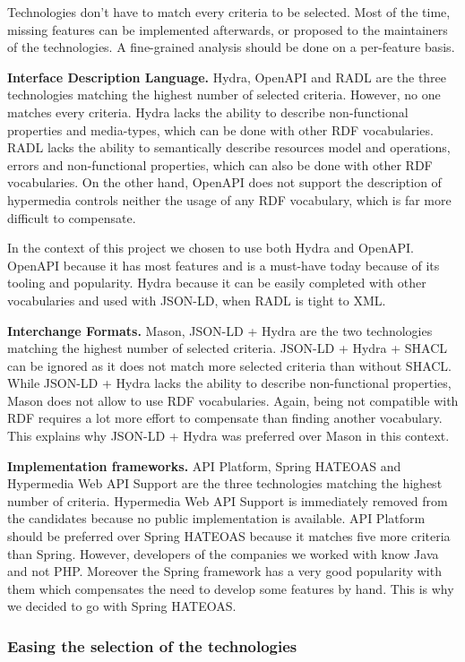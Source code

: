 Technologies don't have to match every criteria to be selected. Most of the time, missing features can be implemented afterwards, or proposed to the maintainers of the technologies. A fine-grained analysis should be done on a per-feature basis.

\textbf{Interface Description Language.} Hydra, OpenAPI and RADL are the three technologies matching the highest number of selected criteria. However, no one matches every criteria. Hydra lacks the ability to describe non-functional properties and media-types, which can be done with other RDF vocabularies. RADL lacks the ability to semantically describe resources model and operations, errors and non-functional properties, which can also be done with other RDF vocabularies. On the other hand, OpenAPI does not support the description of hypermedia controls neither the usage of any RDF vocabulary, which is far more difficult to compensate. 

In the context of this project we chosen to use both Hydra and OpenAPI. OpenAPI because it has most features and is a must-have today because of its tooling and popularity. Hydra because it can be easily completed with other vocabularies and used with JSON-LD, when RADL is tight to XML.

\textbf{Interchange Formats.} Mason, JSON-LD + Hydra are the two technologies matching the highest number of selected criteria. JSON-LD + Hydra + SHACL can be ignored as it does not match more selected criteria than without SHACL. While JSON-LD + Hydra lacks the ability to describe non-functional properties, Mason does not allow to use RDF vocabularies. Again, being not compatible with RDF requires a lot more effort to compensate than finding another vocabulary. This explains why JSON-LD + Hydra was preferred over Mason in this context.

\textbf{Implementation frameworks.} API Platform, Spring HATEOAS and Hypermedia Web API Support \cite{salvadori2014framework} are the three technologies matching the highest number of criteria. Hypermedia Web API Support is immediately removed from the candidates because no public implementation is available. API Platform should be preferred over Spring HATEOAS because it matches five more criteria than Spring. However, developers of the companies we worked with know Java and not PHP. Moreover the Spring framework has a very good popularity with them which compensates the need to develop some features by hand. This is why we decided to go with Spring HATEOAS.

\subsubsection{Easing the selection of the technologies}

